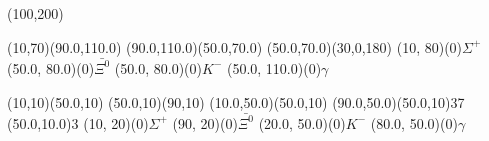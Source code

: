 \documentclass[a4paper]{article}
\begin{document}
        
    \begin{center}
    \begin{axopicture}(100,200) 
    
        \Line[arrow,arrowpos=0.5,arrowlength=6,arrowwidth=3,arrowinset=0.1](10,70)(90.0,110.0)
        \Line[arrow,arrowpos=0.5,arrowlength=6,arrowwidth=3,arrowinset=0.1](90.0,110.0)(50.0,70.0)
        (50.0,70.0)(30,0,180)
        \Text(10, 80)(0){$\Sigma^{+}$}
        \Text(50.0, 80.0)(0){$\bar{\Xi^0}$}
        \Text(50.0, 80.0)(0){$K^{-}$}
        \Text(50.0, 110.0)(0){$\gamma$}
        
        \Line[arrow,arrowpos=0.5,arrowlength=6,arrowwidth=3,arrowinset=0.1](10,10)(50.0,10)
        \Line[arrow,arrowpos=0.5,arrowlength=6,arrowwidth=3,arrowinset=0.1](50.0,10)(90,10)
        \Line[arrow,arrowpos=0.5,arrowlength=6,arrowwidth=3,arrowinset=0.1,dash](10.0,50.0)(50.0,10)
        \Photon(90.0,50.0)(50.0,10){3}{7}
        \Vertex(50.0,10.0){3}
        \Text(10, 20)(0){$\Sigma^{+}$}
        \Text(90, 20)(0){$\bar{\Xi^0}$}
        \Text(20.0, 50.0)(0){$K^{-}$}
        \Text(80.0, 50.0)(0){$\gamma$}
        
        \end{axopicture}
        \end{center}
        
\end{document}
